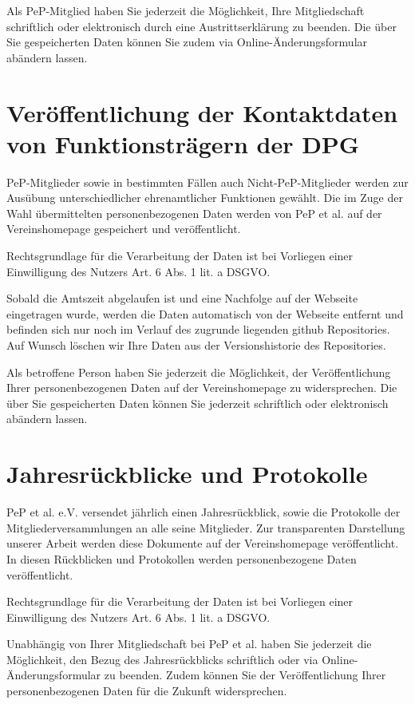 \documentclass[
  fontsize=12pt,
  paper=a4,
  DIV14,
  parskip,
]{scrartcl}
\begin{document}
Als PeP-Mitglied haben Sie jederzeit die Möglichkeit, Ihre Mitgliedschaft
schriftlich oder elektronisch durch eine Austrittserklärung zu beenden.
Die über Sie gespeicherten Daten können Sie zudem via
Online-Änderungsformular abändern lassen.

\section{Veröffentlichung der Kontaktdaten von Funktionsträgern der DPG}

PeP-Mitglieder sowie in bestimmten Fällen auch Nicht-PeP-Mitglieder werden
zur Ausübung unterschiedlicher ehrenamtlicher Funktionen gewählt.
Die im Zuge der Wahl übermittelten personenbezogenen Daten werden von PeP et
al. auf der Vereinshomepage gespeichert und veröffentlicht.

Rechtsgrundlage für die Verarbeitung der Daten ist bei Vorliegen einer
Einwilligung des Nutzers Art. 6 Abs. 1 lit. a DSGVO.

Sobald die Amtszeit abgelaufen ist und eine Nachfolge auf der Webseite
eingetragen wurde, werden die Daten automatisch von der Webseite entfernt und
befinden sich nur noch im Verlauf des zugrunde liegenden github Repositories.
Auf Wunsch löschen wir Ihre Daten aus der Versionshistorie des Repositories.

Als betroffene Person haben Sie jederzeit die Möglichkeit, der
Veröffentlichung Ihrer personenbezogenen Daten auf der Vereinshomepage zu
widersprechen. Die über Sie gespeicherten Daten können Sie jederzeit
schriftlich oder elektronisch abändern lassen.

\section{Jahresrückblicke und Protokolle}

PeP et al. e.V. versendet jährlich einen Jahresrückblick, sowie die
Protokolle der Mitgliederversammlungen an alle seine Mitglieder. Zur
transparenten Darstellung unserer Arbeit werden diese Dokumente auf der
Vereinshomepage veröffentlicht.
In diesen Rückblicken und Protokollen werden personenbezogene Daten
veröffentlicht.

Rechtsgrundlage für die Verarbeitung der Daten ist bei Vorliegen einer
Einwilligung des Nutzers Art. 6 Abs. 1 lit. a DSGVO.

Unabhängig von Ihrer Mitgliedschaft bei PeP et al. haben Sie jederzeit die
Möglichkeit, den Bezug des Jahresrückblicks schriftlich oder via
Online-Änderungsformular zu beenden.
Zudem können Sie der Veröffentlichung Ihrer personenbezogenen Daten für die
Zukunft widersprechen.
\end{document}

